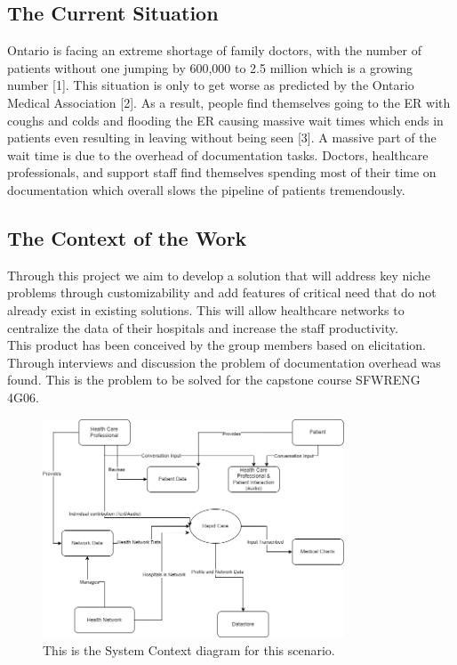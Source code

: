 \documentclass[12pt]{article}
\begin{document}
\subsection{The Current Situation}
Ontario is facing an extreme shortage of family doctors, with the number of patients without one jumping by 600,000 to 2.5 million which is a growing number [1]. This situation is only to get worse as predicted by the Ontario Medical Association [2]. As a result, people find themselves going to the ER with coughs and colds and flooding the ER causing massive wait times which ends in patients even resulting in leaving without being seen [3]. A massive part of the wait time is due to the overhead of documentation tasks. Doctors, healthcare professionals, and support staff find themselves spending most of their time on documentation which overall slows the pipeline of patients tremendously.

\subsection{The Context of the Work}

Through this project we aim to develop a solution that will address key niche problems through customizability and add features of critical need that do not already exist in existing solutions. This will allow healthcare networks to centralize the data of their hospitals and increase the staff productivity.\\

\noindent This product has been conceived by the group members based on elicitation. Through interviews and discussion the problem of documentation overhead was found. This is the problem to be solved for the capstone course SFWRENG 4G06.

\begin{figure}[H]
  \includegraphics[width=0.8\textwidth]{System_Context.png}
  \caption{This is the System Context diagram for this scenario.}
\end{figure}
\end{document}
